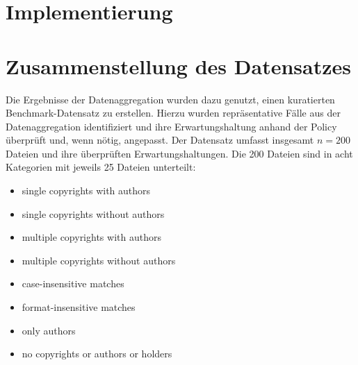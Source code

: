 
\section{Implementierung}\label{sec:benchmark-implementierung}



\section{Zusammenstellung des Datensatzes}\label{sec:datensatz-benchmark}

Die Ergebnisse der Datenaggregation wurden dazu genutzt, einen kuratierten Benchmark-Datensatz zu erstellen.
Hierzu wurden repräsentative Fälle aus der Datenaggregation identifiziert und ihre Erwartungshaltung anhand der Policy überprüft und, wenn nötig, angepasst.
Der Datensatz umfasst insgesamt $n=200$ Dateien und ihre überprüften Erwartungshaltungen.
Die \num{200} Dateien sind in acht Kategorien mit jeweils \num{25} Dateien unterteilt:

\begin{itemize}
    \item single copyrights with authors
    \item single copyrights without authors
    \item multiple copyrights with authors
    \item multiple copyrights without authors
    \item case-insensitive matches
    \item format-insensitive matches
    \item only authors
    \item no copyrights or authors or holders
\end{itemize}

